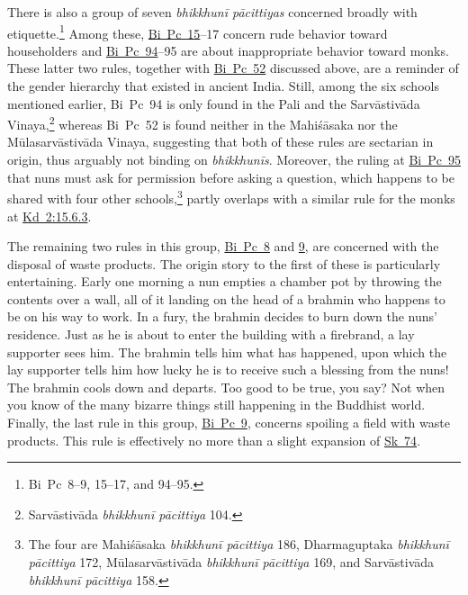 \documentclass[12pt,openany]{book}%
\begin{document}
There is also a group of seven \textit{\textsanskrit{bhikkhunī} \textsanskrit{pācittiyas}} concerned broadly with etiquette.\footnote{Bi Pc 8–9, 15–17, and 94–95. } Among these, \href{https://suttacentral.net/pli-tv-bi-vb-pc15/en/brahmali\#1.19.1}{Bi~Pc~15}–17 concern rude behavior toward householders and \href{https://suttacentral.net/pli-tv-bi-vb-pc94/en/brahmali\#1.11.1}{Bi~Pc~94}–95 are about inappropriate behavior toward monks. These latter two rules, together with \href{https://suttacentral.net/pli-tv-bi-vb-pc52/en/brahmali\#1.29.1}{Bi~Pc~52} discussed above, are a reminder of the gender hierarchy that existed in ancient India. Still, among the six schools mentioned earlier, Bi Pc 94 is only found in the Pali and the \textsanskrit{Sarvāstivāda} Vinaya,\footnote{\textsanskrit{Sarvāstivāda} \textit{\textsanskrit{bhikkhunī} \textsanskrit{pācittiya}} 104. } whereas Bi Pc 52 is found neither in the \textsanskrit{Mahiśāsaka} nor the \textsanskrit{Mūlasarvāstivāda} Vinaya, suggesting that both of these rules are sectarian in origin, thus arguably not binding on \textit{\textsanskrit{bhikkhunīs}}. Moreover, the ruling at \href{https://suttacentral.net/pli-tv-bi-vb-pc95/en/brahmali\#1.11.1}{Bi~Pc~95} that nuns must ask for permission before asking a question, which happens to be shared with four other schools,\footnote{The four are \textsanskrit{Mahiśāsaka} \textit{\textsanskrit{bhikkhunī} \textsanskrit{pācittiya}} 186, Dharmaguptaka \textit{\textsanskrit{bhikkhunī} \textsanskrit{pācittiya}} 172, \textsanskrit{Mūlasarvāstivāda} \textit{\textsanskrit{bhikkhunī} \textsanskrit{pācittiya}} 169, and \textsanskrit{Sarvāstivāda} \textit{\textsanskrit{bhikkhunī} \textsanskrit{pācittiya}} 158. } partly overlaps with a similar rule for the monks at \href{https://suttacentral.net/pli-tv-kd2/en/brahmali\#15.6.3}{Kd~2:15.6.3}.

The remaining two rules in this group, \href{https://suttacentral.net/pli-tv-bi-vb-pc8/en/brahmali\#1.26.1}{Bi~Pc~8} and \href{https://suttacentral.net/pli-tv-bi-vb-pc9/en/brahmali\#1.15.1}{9}, are concerned with the disposal of waste products. The origin story to the first of these is particularly entertaining. Early one morning a nun empties a chamber pot by throwing the contents over a wall, all of it landing on the head of a brahmin who happens to be on his way to work. In a fury, the brahmin decides to burn down the nuns’ residence. Just as he is about to enter the building with a firebrand, a lay supporter sees him. The brahmin tells him what has happened, upon which the lay supporter tells him how lucky he is to receive such a blessing from the nuns! The brahmin cools down and departs. Too good to be true, you say? Not when you know of the many bizarre things still happening in the Buddhist world. Finally, the last rule in this group, \href{https://suttacentral.net/pli-tv-bi-vb-pc9/en/brahmali\#1.15.1}{Bi~Pc~9}, concerns spoiling a field with waste products. This rule is effectively no more than a slight expansion of \href{https://suttacentral.net/pli-tv-bu-vb-sk74/en/brahmali\#1.3.1}{Sk~74}.
\end{document}

